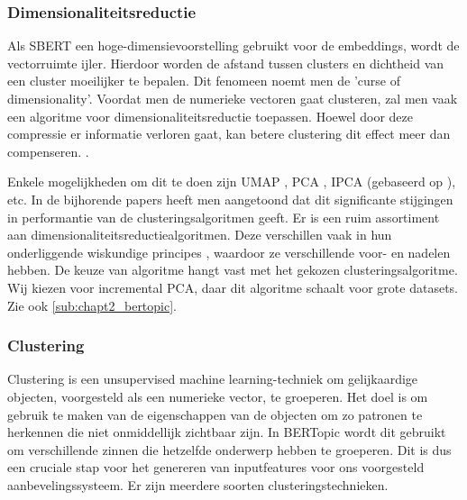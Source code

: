\subsubsection{Dimensionaliteitsreductie}
Als SBERT een hoge-dimensievoorstelling gebruikt voor de embeddings, wordt de vectorruimte ijler. Hierdoor worden de afstand tussen clusters en dichtheid van een cluster moeilijker te bepalen.  Dit fenomeen noemt men de 'curse of dimensionality'. \cite{curse_of_dim, high_dim_problem} Voordat men de numerieke vectoren gaat clusteren, zal men vaak een algoritme voor dimensionaliteitsreductie toepassen. Hoewel door deze compressie er informatie verloren gaat, kan betere clustering dit effect meer dan compenseren. \cite{dim_reduction_summary}.

Enkele mogelijkheden om dit te doen zijn UMAP \cite{paper_umap}, PCA \cite{paper_pca}, IPCA (gebaseerd op \cite{incremental_pca}), etc.
In de bijhorende papers heeft men aangetoond dat dit significante stijgingen in performantie van de clusteringsalgoritmen geeft. 
Er is een ruim assortiment \cite{dim_reduction_options} aan dimensionaliteitsreductiealgoritmen. Deze verschillen vaak in hun onderliggende wiskundige principes \cite{dim_reduction_summary}, waardoor ze verschillende voor- en nadelen hebben. De keuze van algoritme hangt vast met het gekozen clusteringsalgoritme. Wij kiezen voor incremental PCA, daar dit algoritme schaalt voor grote datasets. Zie ook \autoref{sub:chapt2_bertopic}.

\subsubsection{Clustering}
\label{sub:chapt2_bertopic_clustering}
Clustering is een unsupervised machine learning-techniek om gelijkaardige objecten, voorgesteld als een numerieke vector, te groeperen. Het doel is om gebruik te maken van de eigenschappen van de objecten om zo patronen te herkennen die niet onmiddellijk zichtbaar zijn. In BERTopic wordt dit gebruikt om verschillende zinnen die hetzelfde onderwerp hebben te groeperen. Dit is dus een cruciale stap voor het genereren van inputfeatures voor ons voorgesteld aanbevelingssysteem. Er zijn meerdere soorten clusteringstechnieken. \cite{clustering_types_of}

